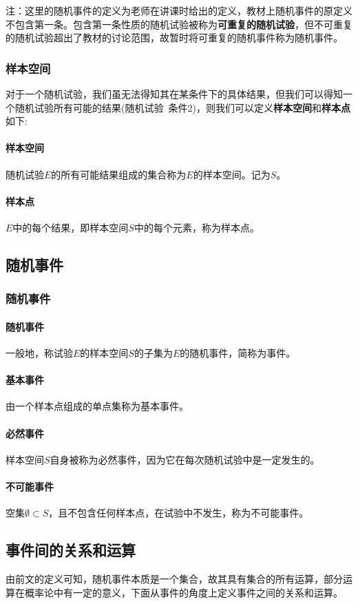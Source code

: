 \documentclass[UTF8]{ctexart}
\begin{document}
		注：这里的随机事件的定义为老师在讲课时给出的定义，教材上随机事件的原定义不包含第一条。包含第一条性质的随机试验被称为\textbf{可重复的随机试验}，但不可重复的随机试验超出了教材的讨论范围，故暂时将可重复的随机事件称为随机事件。
		\subsubsection{样本空间}
		对于一个随机试验，我们虽无法得知其在某条件下的具体结果，但我们可以得知一个随机试验所有可能的结果(随机试验\ 条件2)，则我们可以定义\textbf{样本空间}和\textbf{样本点}如下:
		\paragraph{样本空间} 随机试验$E$的所有可能结果组成的集合称为$E$的样本空间。记为$S$。
		\paragraph{样本点} $E$中的每个结果，即样本空间$S$中的每个元素，称为样本点。
	\subsection{随机事件}
		\subsubsection{随机事件}
		\paragraph{随机事件} 一般地，称试验$E$的样本空间$S$的子集为$E$的随机事件，简称为事件。
		\paragraph{基本事件}由一个样本点组成的单点集称为基本事件。
		\paragraph{必然事件}样本空间$S$自身被称为必然事件，因为它在每次随机试验中是一定发生的。
		\paragraph{不可能事件}空集$\emptyset \subset S$，且不包含任何样本点，在试验中不发生，称为不可能事件。
		\subsection{事件间的关系和运算}
		由前文的定义可知，随机事件本质是一个集合，故其具有集合的所有运算，部分运算在概率论中有一定的意义，下面从事件的角度上定义事件之间的关系和运算。
		
\end{document}
